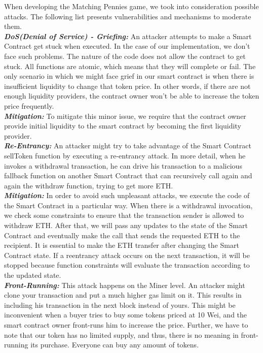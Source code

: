 \documentclass[12pt,a4paper]{article}
\begin{document}
When developing the Matching Pennies game, we took into consideration possible attacks.
The following list presents vulnerabilities and mechanisms to moderate them. \\

\textbf{\emph{DoS(Denial of Service) - Griefing: }}An attacker attempts to make
a Smart Contract get stuck when executed. In the case of our implementation, we
don't face such problems. The nature of the code does not allow the contract to
get stuck. All functions are atomic, which means that they will complete or
fail. The only scenario in which we might face grief in our smart contract is
when there is insufficient liquidity to change that token price. In other words,
if there are not enough liquidity providers, the contract owner won't be able to
increase the token price frequently.\\

\textbf{\emph{Mitigation: }}To mitigate this minor issue, we require that the
contract owner provide initial liquidity to the smart contract by becoming the
first liquidity provider. \\

\textbf{\emph{Re-Entrancy: }}An attacker might try to take advantage of the
Smart Contract sellToken function by executing a re-entrancy attack. In more
detail, when he invokes a withdrawal transaction, he can drive his transaction
to a malicious fallback function on another Smart Contract that can recursively
call again and again the withdraw function, trying to get more ETH.\\

\textbf{\emph{Mitigation: }}In order to avoid such unpleasant attacks, we
execute the code of the Smart Contract in a particular way. When there is a
withdrawal invocation, we check some constraints to ensure that the transaction
sender is allowed to withdraw ETH. After that, we will pass any updates to the
state of the Smart Contract and eventually make the call that sends the
requested ETH to the recipient. It is essential to make the ETH transfer after
changing the Smart Contract state. If a reentrancy attack occurs on the next
transaction, it will be stopped because function constraints will evaluate the
transaction according to the updated state.\\

\textbf{\emph{Front-Running: }} This attack happens on the Miner level. An
attacker might clone your transaction and put a much higher gas limit on it.
This results in including his transaction in the next block instead of yours.
This might be inconvenient when a buyer tries to buy some tokens priced at 10
Wei, and the smart contract owner front-runs him to increase the price. Further,
we have to note that our token has no limited supply, and thus, there is no
meaning in front-running its purchase. Everyone can buy any amount of tokens. \\
\end{document}
